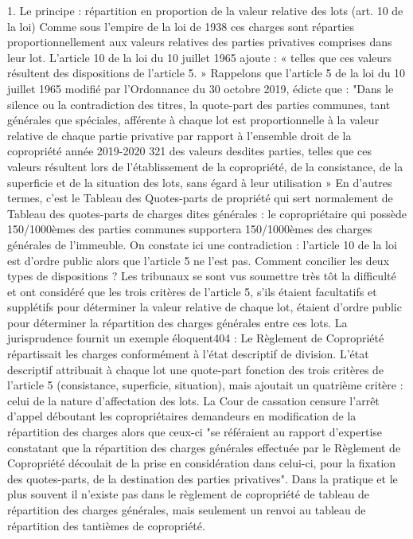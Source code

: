 		1. Le principe : répartition en proportion de la valeur relative des lots (art. 10 de la loi)
		Comme sous l'empire de la loi de 1938 ces charges sont réparties proportionnellement aux valeurs relatives des parties privatives comprises dans leur lot. L'article 10 de la loi du 10 juillet 1965 ajoute : « telles que ces valeurs résultent des dispositions de l'article 5. »
		Rappelons que l'article 5 de la loi du 10 juillet 1965 modifié par l’Ordonnance du 30 octobre 2019, édicte que :
		"Dans le silence ou la contradiction des titres, la quote-part des parties communes, tant générales que spéciales, afférente à chaque lot est proportionnelle à la valeur relative de chaque partie privative par rapport à l'ensemble
		droit de la copropriété année 2019-2020
		321
		des valeurs desdites parties, telles que ces valeurs résultent lors de l'établissement de la copropriété, de la consistance, de la superficie et de la situation des lots, sans égard à leur utilisation »
		En d'autres termes, c'est le Tableau des Quotes-parts de propriété qui sert normalement de Tableau des quotes-parts de charges dites générales : le copropriétaire qui possède 150/1000èmes des parties communes supportera 150/1000èmes des charges générales de l'immeuble.
		On constate ici une contradiction : l'article 10 de la loi est d'ordre public alors que l'article 5 ne l'est pas. Comment concilier les deux types de dispositions ? Les tribunaux se sont vus soumettre très tôt la difficulté et ont considéré que les trois critères de l'article 5, s'ils étaient facultatifs et supplétifs pour déterminer la valeur relative de chaque lot, étaient d'ordre public pour déterminer la répartition des charges générales entre ces lots.
		La jurisprudence fournit un exemple éloquent404 :
		Le Règlement de Copropriété répartissait les charges conformément à l’état descriptif de division. L’état descriptif attribuait à chaque lot une quote-part fonction des trois critères de l’article 5 (consistance, superficie, situation), mais ajoutait un quatrième critère : celui de la nature d’affectation des lots.
		La Cour de cassation censure l’arrêt d'appel déboutant les copropriétaires demandeurs en modification de la répartition des charges alors que ceux-ci "se référaient au rapport d'expertise constatant que la répartition des charges générales effectuée par le Règlement de Copropriété découlait de la prise en considération dans celui-ci, pour la fixation des quotes-parts, de la destination des parties privatives".
		Dans la pratique et le plus souvent il n'existe pas dans le règlement de copropriété de tableau de répartition des charges générales, mais seulement un renvoi au tableau de répartition des tantièmes de copropriété.
